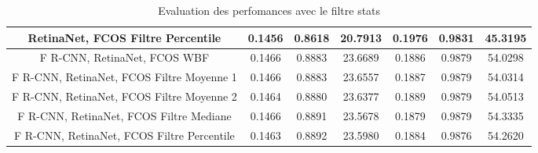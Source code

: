 \documentclass{article}
\begin{document}
\begin{table}[h!]
\begin{tabular}{|c||c|c|c||c|c|c|}
\hline
RetinaNet, FCOS Filtre Percentile & 0.1456 & 0.8618 & 20.7913 & 0.1976 & 0.9831 & 45.3195 \\ 
\hline
F R-CNN, RetinaNet, FCOS WBF & 0.1466 & 0.8883 & 23.6689 & 0.1886 & 0.9879 & 54.0298 \\ 
\hline
F R-CNN, RetinaNet, FCOS Filtre Moyenne 1 & 0.1466 & 0.8883 & 23.6557 & 0.1887 & 0.9879 & 54.0314 \\ 
\hline
F R-CNN, RetinaNet, FCOS Filtre Moyenne 2 & 0.1464 & 0.8880 & 23.6377 & 0.1889 & 0.9879 & 54.0513 \\ 
\hline
F R-CNN, RetinaNet, FCOS Filtre Mediane & 0.1466 & 0.8891 & 23.5678 & 0.1879 & 0.9879 & 54.3335 \\ 
\hline
F R-CNN, RetinaNet, FCOS Filtre Percentile & 0.1463 & 0.8892 & 23.5980 & 0.1884 & 0.9876 & 54.2620 \\ 
\hline
\end{tabular}
\caption{Evaluation des perfomances avec le filtre stats}
\label{table:data}
\end{table}
\end{document}
